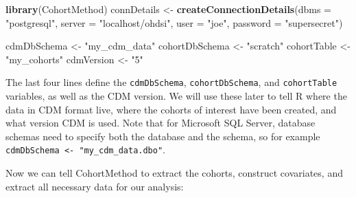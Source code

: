 \documentclass[]{book}
\newenvironment{Shaded}{\begin{snugshade}}{\end{snugshade}}
\newcommand{\DataTypeTok}[1]{\textcolor[rgb]{0.13,0.29,0.53}{#1}}
\newcommand{\KeywordTok}[1]{\textcolor[rgb]{0.13,0.29,0.53}{\textbf{#1}}}
\newcommand{\NormalTok}[1]{#1}
\newcommand{\StringTok}[1]{\textcolor[rgb]{0.31,0.60,0.02}{#1}}
\begin{document}
\begin{Shaded}
\begin{Highlighting}[]
\KeywordTok{library}\NormalTok{(CohortMethod)}
\NormalTok{connDetails <-}\StringTok{ }\KeywordTok{createConnectionDetails}\NormalTok{(}\DataTypeTok{dbms =} \StringTok{"postgresql"}\NormalTok{,}
                                       \DataTypeTok{server =} \StringTok{"localhost/ohdsi"}\NormalTok{,}
                                       \DataTypeTok{user =} \StringTok{"joe"}\NormalTok{,}
                                       \DataTypeTok{password =} \StringTok{"supersecret"}\NormalTok{)}

\NormalTok{cdmDbSchema <-}\StringTok{ "my_cdm_data"}
\NormalTok{cohortDbSchema <-}\StringTok{ "scratch"}
\NormalTok{cohortTable <-}\StringTok{ "my_cohorts"}
\NormalTok{cdmVersion <-}\StringTok{ "5"}
\end{Highlighting}
\end{Shaded}

The last four lines define the \texttt{cdmDbSchema}, \texttt{cohortDbSchema}, and \texttt{cohortTable} variables, as well as the CDM version. We will use these later to tell R where the data in CDM format live, where the cohorts of interest have been created, and what version CDM is used. Note that for Microsoft SQL Server, database schemas need to specify both the database and the schema, so for example \texttt{cdmDbSchema\ \textless{}-\ "my\_cdm\_data.dbo"}.

Now we can tell CohortMethod to extract the cohorts, construct covariates, and extract all necessary data for our analysis:
\end{document}
